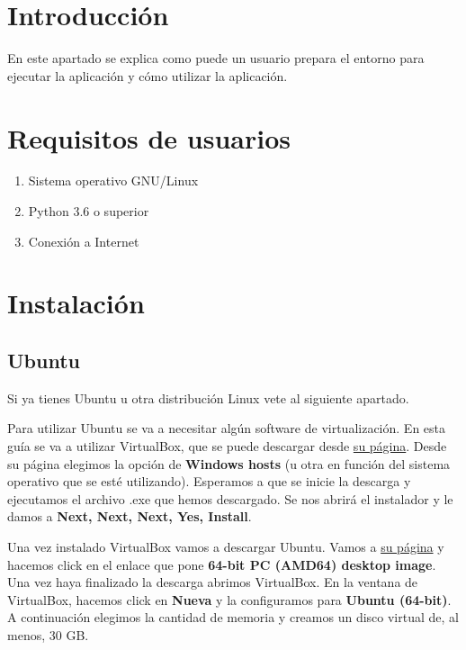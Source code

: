 
\section{Introducción}

En este apartado se explica como puede un usuario prepara el entorno para ejecutar la aplicación y cómo utilizar la aplicación.

\section{Requisitos de usuarios}
\begin{enumerate}
	\item Sistema operativo GNU/Linux
	\item Python 3.6 o superior
	\item Conexión a Internet
\end{enumerate}

\section{Instalación}

\subsection{Ubuntu}

Si ya tienes Ubuntu u otra distribución Linux vete al siguiente apartado.

Para utilizar Ubuntu se va a necesitar algún software de virtualización. En esta guía se va a utilizar VirtualBox, que se puede descargar desde \href{https://www.virtualbox.org/wiki/Downloads}{su página}.
Desde su página elegimos la opción de \textbf{Windows hosts} (u otra en función del sistema operativo que se esté utilizando). Esperamos a que se inicie la descarga y ejecutamos el archivo .exe que hemos descargado. Se nos abrirá el instalador y le damos a \textbf{Next, Next, Next, Yes, Install}.

Una vez instalado VirtualBox vamos a descargar Ubuntu. Vamos a \href{https://releases.ubuntu.com/18.04.4/}{su página} y hacemos click en el enlace que pone \textbf{64-bit PC (AMD64) desktop image}. Una vez haya finalizado la descarga abrimos VirtualBox. En la ventana de VirtualBox, hacemos click en \textbf{Nueva} y la configuramos para \textbf{Ubuntu (64-bit)}. A continuación elegimos la cantidad de memoria y creamos un disco virtual de, al menos, 30 GB.

